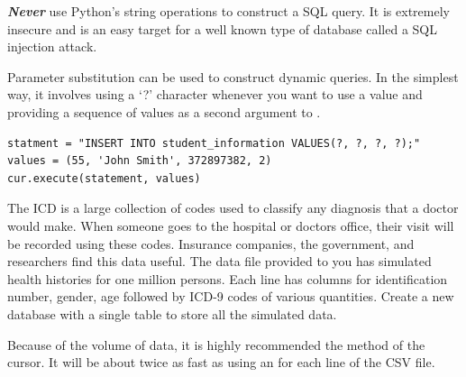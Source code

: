 \begin{warn}
\emph{\textbf{Never}} use Python's string operations to construct a SQL query.
It is extremely insecure and is an easy target for a well known type of database called a SQL injection attack.

Parameter substitution can be used to construct dynamic queries.
In the simplest way, it involves using a `?' character whenever you want to use a value and providing a sequence of values as a second argument to .
\begin{lstlisting}
statment = "INSERT INTO student_information VALUES(?, ?, ?, ?);"
values = (55, 'John Smith', 372897382, 2)
cur.execute(statement, values)
\end{lstlisting}
\end{warn}

\begin{problem}
The ICD is a large collection of codes used to classify any diagnosis that a doctor would make.
When someone goes to the hospital or doctors office, their visit will be recorded using these codes.
Insurance companies, the government, and researchers find this data useful.
The data file provided to you has simulated health histories for one million persons.
Each line has columns for identification number, gender, age followed by ICD-9 codes of various quantities.
Create a new database with a single table to store all the simulated data.

Because of the volume of data, it is highly recommended the  method of the cursor.
It will be about twice as fast as using an  for each line of the CSV file.
\label{prob:icd9tables}
\end{problem}

